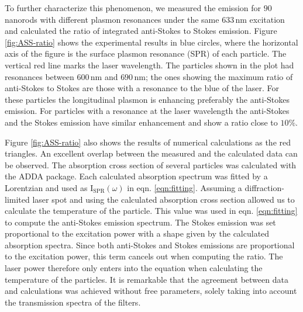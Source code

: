 \documentclass[journal=nalefd,manuscript=letter]{achemso}
\newcommand{\nm}{\ensuremath{\,\textrm{nm}}}
\begin{document}
To further characterize this phenomenon, we measured the emission for $90$
nanorods with different plasmon resonances under the same $633\nm$ excitation
and calculated the ratio of integrated anti-Stokes to Stokes emission.
Figure \ref{fig:ASS-ratio} shows the experimental results in blue circles, where
the horizontal axis of the figure is the surface plasmon resonance (SPR) of each
particle. The vertical red line marks the laser wavelength. The particles shown
in the plot had resonances between $600\nm$ and $690\nm$; the ones showing the
maximum ratio of anti-Stokes to Stokes are those with a resonance to the blue of
the laser. For these particles the longitudinal plasmon is enhancing preferably the
anti-Stokes emission. For particles with a resonance at the laser wavelength the
anti-Stokes and the Stokes emission have similar enhancement and show a ratio
close to $10\%$.

Figure \ref{fig:ASS-ratio} also shows the results of numerical calculations as the red
triangles. An excellent overlap between the measured and the calculated data can
be observed. The absorption cross section of several particles was calculated
with the ADDA package\cite{Yurkin2011}. Each calculated absorption spectrum was
fitted by a Lorentzian and used as $\textrm{I}_{\textrm{SPR}}(\omega)$ in eqn.
\ref{eqn:fitting}. Assuming a diffraction-limited laser spot and using the
calculated absorption cross section allowed us to calculate the temperature of
the particle. This value was used in eqn. \ref{eqn:fitting} to compute the
anti-Stokes emission spectrum. The Stokes emission was set proportional to the
excitation power  with a shape given by the calculated absorption spectra. Since both
anti-Stokes and Stokes emissions are proportional to the excitation power, this
term cancels out when computing the ratio. The laser power therefore only enters
into the equation when calculating the temperature of the particles. It is
remarkable that the agreement between data and calculations was achieved
without free parameters, solely taking into account the transmission spectra of
the filters.
\end{document}
